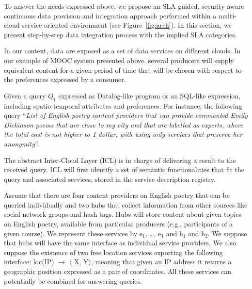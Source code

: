To answer the needs expressed above, we propose an SLA guided, security-aware continuous data provision and integration approach performed within a multi-cloud service oriented environment  (see
Figure~\ref{fig:arch}). In this section, we present  step-by-step data integration process with the implied  SLA categories.

In our context, data are exposed as  a set of data services on different clouds. In our example of MOOC system presented above, several producers will supply equivalent content for a given period of time  that will be chosen with respect to the  preferences expressed by a consumer. 

Given a query $Q_1$ expressed as Datalog-like program or an SQL-like expression, including spatio-temporal attributes and preferences.
For instance, the following query ``\textit{List of English poetry content providers that can provide commented Emily Dickinson poems that are close to my city and that are labelled as experts, where the total cost is not higher to 1 dollar, with using only services that preserve her anonymity}''. 

The abstract Inter-Cloud Layer (ICL) is in charge of delivering a result to the received query. ICL will first identify a set of semantic functionalities that fit the  query and associated services, stored in the service description registry.

Assume that there are four content providers on English poetry that can be queried individually and two hubs that collect information from other sources like social network groups and hash tags.
Hubs will store content about given topics on  English poetry, available from particular producers (e.g., participants of a given course).
We represent these services by { e$_1$, \dots, e$_4$} and {h$_1$} and {h$_2$}. We suppose that hubs will have the same interface as individual service providers.
We also suppose the existence of two free location services exporting the following interface: {loc(IP) $\rightarrow$ $\langle$ X, Y$\rangle$}, meaning that given an IP address it returns a geographic position expressed as a pair of coordinates. 
All these services can potentially be combined for answering queries.



